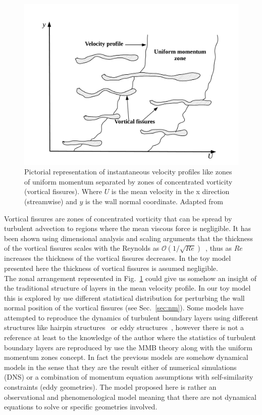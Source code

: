 \documentclass[aps,reprint,amsmath,amssymb,pra]{revtex4-1}%
\begin{document}
\begin{figure}[b]
\includegraphics[scale=0.305]{figures/uniform_velocity_vortical_fissures}
\caption{\label{fig:vortical_fissures} Pictorial representation of instantaneous velocity profiles like zones of uniform momentum separated by zones of concentrated vorticity (vortical fissures). Where $U$ is the mean velocity in the x direction (streamwise) and $y$ is the wall normal coordinate.
Adapted from~\citep{priya2007}}
\end{figure} 
Vortical fissures are zones of concentrated vorticity that can
be spread by turbulent advection to regions where the mean viscous force is negligible. It has been shown using dimensional
analysis and scaling arguments that the thickness of the vortical fissures scales with the Reynolds as $\mathcal{O}(1/\sqrt{Re})$~\citep{tennekes1968}, thus as $Re$ increases the thickness of the vortical fissures decreases. In the toy model presented here the thickness of vortical fissures is assumed negligible.\\ 
The zonal arrangement represented in Fig.~\ref{fig:vortical_fissures} could give us somehow an insight of the traditional structure of layers in the mean velocity profile. In our toy model this is explored by use different statistical distribution for perturbing the wall normal position of the vortical fissures (see Sec.~\ref{sec:nm}). 
Some models have attempted to reproduce the dynamics of turbulent boundary layers using different structures like hairpin structures~\citep{adrian2007} or eddy structures~\citep{perry1995}, however there is not a reference at least to the knowledge of the author where the statistics of turbulent boundary layers are reproduced by use the MMB theory along with the uniform momentum zones concept. In fact the previous models are somehow dynamical models in the sense that they are the result either of numerical simulations (DNS) or a combination of momentum equation assumptions with self-similarity constraints (eddy geometries). The model proposed here is rather an observational and phenomenological model meaning that there are not dynamical equations to solve or specific geometries involved.\\
\end{document}
